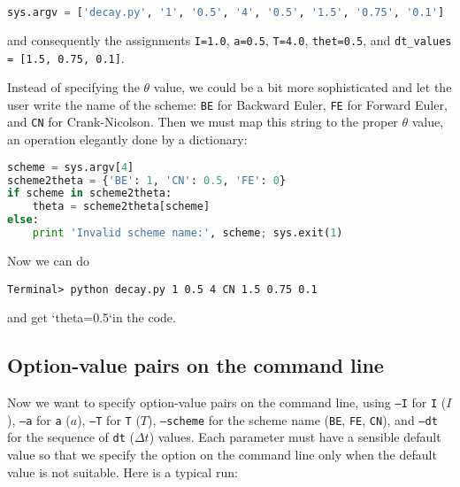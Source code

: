 \documentclass[graybox,sectrefs,envcountresetchap,open=right,final]{svmonodo}
\begin{document}
\begin{lstlisting}[language=python,style=blue1_bluegreen]
sys.argv = ['decay.py', '1', '0.5', '4', '0.5', '1.5', '0.75', '0.1']

\end{lstlisting}

and consequently the assignments \texttt{I=1.0}, \texttt{a=0.5}, \texttt{T=4.0}, \texttt{thet=0.5},
and \Verb!dt_values = [1.5, 0.75, 0.1]!.

Instead of specifying the $\theta$ value, we could be a bit more
sophisticated and let the user write the name of the scheme:
\texttt{BE} for Backward Euler, \texttt{FE} for Forward Euler, and \texttt{CN}
for Crank-Nicolson. Then we must map this string to the proper
$\theta$ value, an operation elegantly done by a dictionary:








\begin{lstlisting}[language=python,style=blue1_bluegreen]
scheme = sys.argv[4]
scheme2theta = {'BE': 1, 'CN': 0.5, 'FE': 0}
if scheme in scheme2theta:
    theta = scheme2theta[scheme]
else:
    print 'Invalid scheme name:', scheme; sys.exit(1)

\end{lstlisting}

Now we can do



\begin{Verbatim}[frame=lines,label=\fbox{{\tiny Terminal}},framesep=2.5mm,framerule=0.7pt,fontsize=\fontsize{9pt}{9pt}]
Terminal> python decay.py 1 0.5 4 CN 1.5 0.75 0.1

\end{Verbatim}

and get `theta=0.5`in the code.

\subsection{Option-value pairs on the command line}
\label{softeng1:basic:UI:options_cml}


Now we want to specify option-value pairs on the command line,
using \texttt{--I} for \texttt{I} ($I$), \texttt{--a} for \texttt{a} ($a$), \texttt{--T} for \texttt{T} ($T$),
\texttt{--scheme} for the scheme name (\texttt{BE}, \texttt{FE}, \texttt{CN}),
and \texttt{--dt} for the sequence of \texttt{dt} ($\Delta t$) values.
Each parameter must have a sensible default value so
that we specify the option on the command line only when the default
value is not suitable. Here is a typical run:
\end{document}
